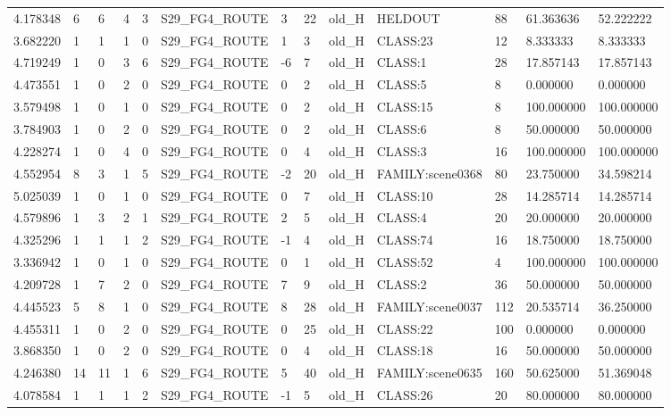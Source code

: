 \begin{tabular}{lllllllllllll}
4.178348 & 6 & 6 & 4 & 3 & S29\_FG4\_ROUTE & 3 & 22 & old\_H & HELDOUT & 88 & 61.363636 & 52.222222 \\
3.682220 & 1 & 1 & 1 & 0 & S29\_FG4\_ROUTE & 1 & 3 & old\_H & CLASS:23 & 12 & 8.333333 & 8.333333 \\
4.719249 & 1 & 0 & 3 & 6 & S29\_FG4\_ROUTE & -6 & 7 & old\_H & CLASS:1 & 28 & 17.857143 & 17.857143 \\
4.473551 & 1 & 0 & 2 & 0 & S29\_FG4\_ROUTE & 0 & 2 & old\_H & CLASS:5 & 8 & 0.000000 & 0.000000 \\
3.579498 & 1 & 0 & 1 & 0 & S29\_FG4\_ROUTE & 0 & 2 & old\_H & CLASS:15 & 8 & 100.000000 & 100.000000 \\
3.784903 & 1 & 0 & 2 & 0 & S29\_FG4\_ROUTE & 0 & 2 & old\_H & CLASS:6 & 8 & 50.000000 & 50.000000 \\
4.228274 & 1 & 0 & 4 & 0 & S29\_FG4\_ROUTE & 0 & 4 & old\_H & CLASS:3 & 16 & 100.000000 & 100.000000 \\
4.552954 & 8 & 3 & 1 & 5 & S29\_FG4\_ROUTE & -2 & 20 & old\_H & FAMILY:scene0368 & 80 & 23.750000 & 34.598214 \\
5.025039 & 1 & 0 & 1 & 0 & S29\_FG4\_ROUTE & 0 & 7 & old\_H & CLASS:10 & 28 & 14.285714 & 14.285714 \\
4.579896 & 1 & 3 & 2 & 1 & S29\_FG4\_ROUTE & 2 & 5 & old\_H & CLASS:4 & 20 & 20.000000 & 20.000000 \\
4.325296 & 1 & 1 & 1 & 2 & S29\_FG4\_ROUTE & -1 & 4 & old\_H & CLASS:74 & 16 & 18.750000 & 18.750000 \\
3.336942 & 1 & 0 & 1 & 0 & S29\_FG4\_ROUTE & 0 & 1 & old\_H & CLASS:52 & 4 & 100.000000 & 100.000000 \\
4.209728 & 1 & 7 & 2 & 0 & S29\_FG4\_ROUTE & 7 & 9 & old\_H & CLASS:2 & 36 & 50.000000 & 50.000000 \\
4.445523 & 5 & 8 & 1 & 0 & S29\_FG4\_ROUTE & 8 & 28 & old\_H & FAMILY:scene0037 & 112 & 20.535714 & 36.250000 \\
4.455311 & 1 & 0 & 2 & 0 & S29\_FG4\_ROUTE & 0 & 25 & old\_H & CLASS:22 & 100 & 0.000000 & 0.000000 \\
3.868350 & 1 & 0 & 2 & 0 & S29\_FG4\_ROUTE & 0 & 4 & old\_H & CLASS:18 & 16 & 50.000000 & 50.000000 \\
4.246380 & 14 & 11 & 1 & 6 & S29\_FG4\_ROUTE & 5 & 40 & old\_H & FAMILY:scene0635 & 160 & 50.625000 & 51.369048 \\
4.078584 & 1 & 1 & 1 & 2 & S29\_FG4\_ROUTE & -1 & 5 & old\_H & CLASS:26 & 20 & 80.000000 & 80.000000 \\

\end{tabular}
